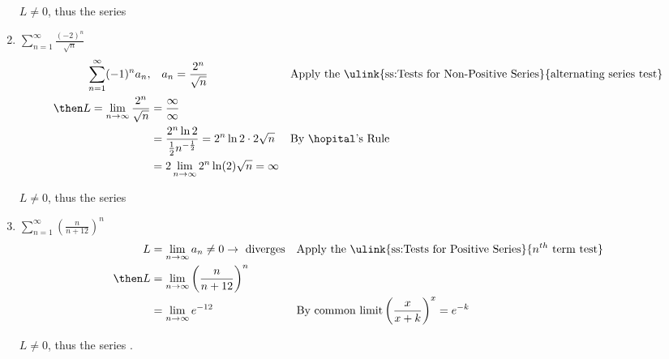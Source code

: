 \begin{enumerate}[itemsep=12em]
    \(L \neq 0\), thus the series 

\vspace{-64pt}
  \item \(\displaystyle \sum_{n=1}^{\infty} \frac{(-2)^n}{\sqrt{n} } \)
    \begin{align*}
      \sum_{n=1}^{\infty} (-1)^n a_n, &\quad a_n = \frac{2^n}{\sqrt{n}}
      && \text{Apply the \ulink{ss:Tests for Non-Positive Series}{alternating series test}} \\
      \then L = \lim_{n \to \infty} \frac{2^n}{\sqrt{n} } &= \frac{\infty}{\infty} \\
      &= \frac{2^n \ln 2}{\frac{1}{2} n^{-\frac{1}{2}}} = 2^n \ln 2 \cdot 2 \sqrt{n}
      && \text{By \hopital's Rule} \\
      &= 2 \lim_{n \to \infty} 2^n \ln(2) \sqrt{n} = \infty
    \end{align*}

    \(L \neq 0\), thus the series 

  \item \(\displaystyle \sum_{n=1}^{\infty} \left( \frac{n}{n+12} \right)^n \)
    \begin{align*}
      L &= \lim_{n \to \infty} a_n \neq 0 \to ~\text{diverges}
      && \text{Apply the \ulink{ss:Tests for Positive Series}{\(n^{th} \) term test}} \\
      \then L &= \lim_{n \to \infty} \left( \frac{n}{n+12} \right)^n \\
              &= \lim_{n \to \infty} e^{-12}
      && \text{By common limit} \left( \frac{x}{x+k} \right)^x = e^{-k}  \\
    \end{align*}

    \(L \neq 0\), thus the series .

\end{enumerate}

